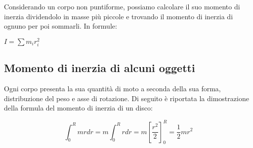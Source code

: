 \documentclass[10pt,a4paper]{article}
\begin{document}
	Considerando un corpo non puntiforme, possiamo calcolare il suo momento di inerzia dividendolo in masse più piccole e trovando il momento di inerzia di ognuno per poi sommarli. In formule:
	
	\begin{definition}
		$I = \sum m_i r_i^2$
	\end{definition}

	\subsection{Momento di inerzia di alcuni oggetti}
	
	Ogni corpo presenta la sua quantità di moto a seconda della sua forma, distribuzione del peso e asse di rotazione. Di seguito è riportata la dimostrazione della formula del momento di inerzia di un disco:
	
	\begin{equation}
		\int_{0}^{R} mr dr = m \int_{0}^{R} r dr = m [\frac{r^2}{2}]_0^R = \frac{1}{2}mr^2  
	\end{equation} 
	
\end{document}
